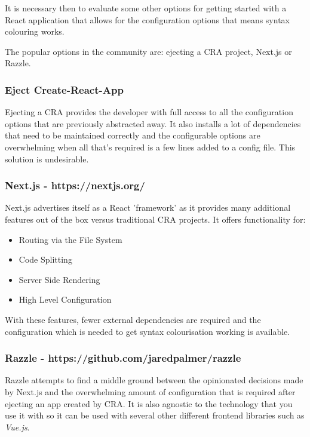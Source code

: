 It is necessary then to evaluate some other options for getting started with a React application that allows for the configuration options that means syntax colouring works.

The popular options in the community are: ejecting a CRA project, Next.js or Razzle. 

\subsubsection{Eject Create-React-App}
Ejecting a CRA provides the developer with full access to all the configuration options that are previously abstracted away. It also installs a lot of dependencies that need to be maintained correctly and the configurable options are overwhelming when all that's required is a few lines added to a config file. This solution is undesirable.

\subsubsection{Next.js - https://nextjs.org/}
Next.js advertises itself as a React 'framework' as it provides many additional features out of the box versus traditional CRA projects. It offers functionality for:

\begin{itemize}
    \item Routing via the File System
    \item Code Splitting
    \item Server Side Rendering
    \item High Level Configuration
\end{itemize}

With these features, fewer external dependencies are required and the configuration which is needed to get syntax colourisation working is available. 

\subsubsection{Razzle - https://github.com/jaredpalmer/razzle}

Razzle attempts to find a middle ground between the opinionated decisions made by Next.js and the overwhelming amount of configuration that is required after ejecting an app created by CRA. It is also agnostic to the technology that you use it with so it can be used with several other different frontend libraries such as \textit{Vue.js}.

